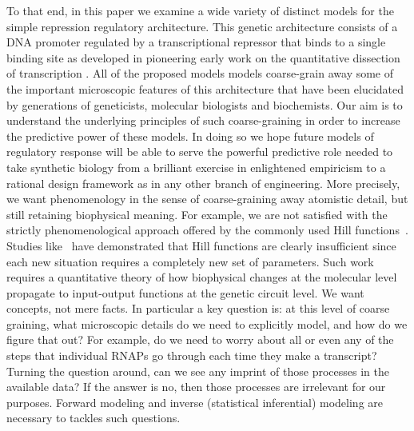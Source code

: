 To that end, in this paper we examine a wide variety of distinct models for the
simple repression regulatory architecture. This genetic architecture consists of
a DNA promoter regulated by a transcriptional repressor that binds to a single
binding site as developed in pioneering early work on
the quantitative dissection of transcription \cite{Oehler1994, Oehler1990}. All of the proposed models models coarse-grain
away some of the important microscopic features of this architecture that have
been elucidated by generations of geneticists, molecular biologists and
biochemists. Our aim is to understand the underlying principles of such
coarse-graining in order to increase the predictive power of these models. In
doing so we hope future models of regulatory response will be able to serve the
powerful predictive role needed to take synthetic biology from a brilliant
exercise in enlightened empiricism to a rational design framework as  in any
other branch of engineering. More precisely, we want phenomenology in the sense
of coarse-graining away atomistic detail, but still retaining biophysical
meaning. For example, we are not satisfied with the strictly phenomenological
approach offered by the commonly used Hill functions~\cite{Frank2013}.
Studies like~\cite{Razo-Mejia2018} have demonstrated that Hill functions are
clearly insufficient since each new situation requires a completely new set of
parameters. Such work requires a quantitative theory of how biophysical changes
at the molecular level propagate to input-output functions at the genetic
circuit level. We want concepts, not mere facts. In particular a key question
is: at this level of coarse graining, what microscopic details do we need to
explicitly model, and how do we figure that out? For example, do we need to
worry about all or even any of the steps that individual RNAPs go through each
time they make a transcript? Turning the question around, can we see any imprint
of those processes in the available data? If the answer is no, then those
processes are irrelevant for our purposes. Forward modeling and inverse
(statistical inferential) modeling are necessary to tackles such questions.

